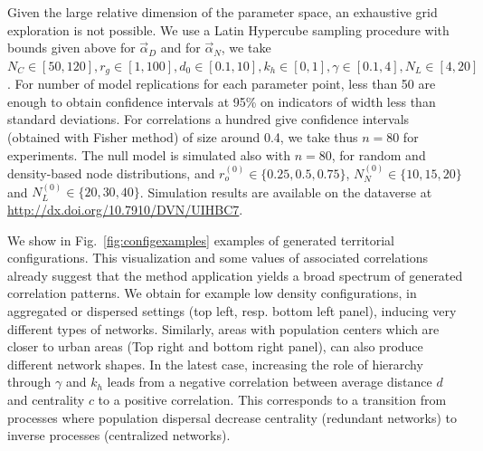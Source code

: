 \documentclass{bmcart}
\begin{document}
Given the large relative dimension of the parameter space, an exhaustive grid exploration is not possible. We use a Latin Hypercube sampling procedure with bounds given above for $\vec{\alpha}_D$ and for $\vec{\alpha}_N$, we take $N_C \in [50,120], r_g \in [1,100] , d_0 \in [0.1,10] , k_h \in [0,1] , \gamma \in [0.1,4],N_L\in [4,20]$. For number of model replications for each parameter point, less than 50 are enough to obtain confidence intervals at 95\% on indicators of width less than standard deviations. For correlations a hundred give confidence intervals (obtained with Fisher method) of size around 0.4, we take thus $n=80$ for experiments. The null model is simulated also with $n=80$, for random and density-based node distributions, and $r_o^{(0)} \in \{0.25,0.5,0.75\}$, $N_N^{(0)} \in \{10,15,20\}$ and $N_L^{(0)} \in \{20,30,40\}$. Simulation results are available on the dataverse at \url{http://dx.doi.org/10.7910/DVN/UIHBC7}.


We show in Fig.~\ref{fig:configexamples} examples of generated territorial configurations. This visualization and some values of associated correlations already suggest that the method application yields a broad spectrum of generated correlation patterns. We obtain for example low density configurations, in aggregated or dispersed settings (top left, resp. bottom left panel), inducing very different types of networks. Similarly, areas with population centers which are closer to urban areas (Top right and bottom right panel), can also produce different network shapes. In the latest case, increasing the role of hierarchy through $\gamma$ and $k_h$ leads from a negative correlation between average distance $d$ and centrality $c$ to a positive correlation. This corresponds to a transition from processes where population dispersal decrease centrality (redundant networks) to inverse processes (centralized networks).
\end{document}

